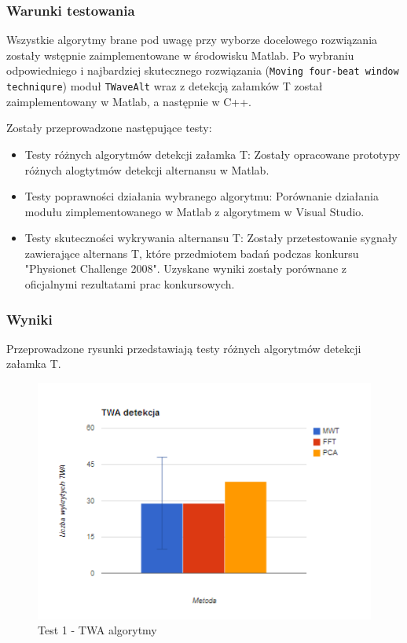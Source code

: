 \documentclass[a4paper, 11pt]{article}
\begin{document}
\medskip{}

\subsubsection{Warunki testowania}
\label{sec::t_wave_alt:tests}
Wszystkie algorytmy brane pod uwagę przy wyborze docelowego rozwiązania zostały wstępnie zaimplementowane w środowisku Matlab. Po wybraniu odpowiedniego i najbardziej skutecznego rozwiązania (\verb|Moving four-beat window techniqure|) moduł \verb|TWaveAlt| wraz z detekcją załamków T został zaimplementowany w Matlab, a następnie w C++. 

Zostały przeprowadzone następujące testy:

\begin{itemize}
\item Testy różnych algorytmów detekcji załamka T: Zostały opracowane prototypy różnych alogtytmów detekcji alternansu w Matlab. 
\item Testy poprawności działania wybranego algorytmu: Porównanie działania modułu zimplementowanego w Matlab z algorytmem w Visual Studio. 
\item Testy skuteczności wykrywania alternansu T: Zostały przetestowanie sygnały zawierające alternans T, które przedmiotem badań podczas konkursu "Physionet Challenge 2008". Uzyskane wyniki zostały porównane z oficjalnymi rezultatami prac konkursowych.
\end{itemize}

\subsubsection{Wyniki}
\label{sec::t_wave_alt:results}
Przeprowadzone rysunki przedstawiają testy różnych algorytmów detekcji załamka T.

\begin{center}
%
\begin{figure}
\begin{centering}
\includegraphics[scale=0.4]{include/twa_2}
\par\end{centering}

\caption{Test 1 - TWA algorytmy}
\label{fig:twa_2}
\end{figure}

\par\end{center}
\end{document}
